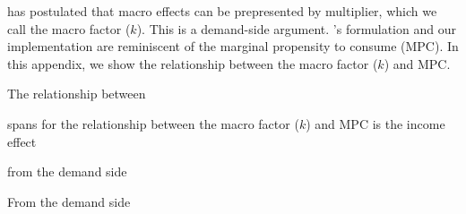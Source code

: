 
\citet{Borenstein:2015aa} has postulated that macro effects 
can be prepresented by multiplier, which we call the macro factor ($k$).
This is a demand-side argument.
\citeauthor{Borenstein:2015aa}'s formulation and our implementation 
are reminiscent of the marginal propensity to consume (MPC).
In this appendix, we show the relationship between the macro factor ($k$) and MPC.

The relationship between 


spans for the relationship between the macro factor ($k$) and MPC
is the income effect


from the demand side



From the demand side